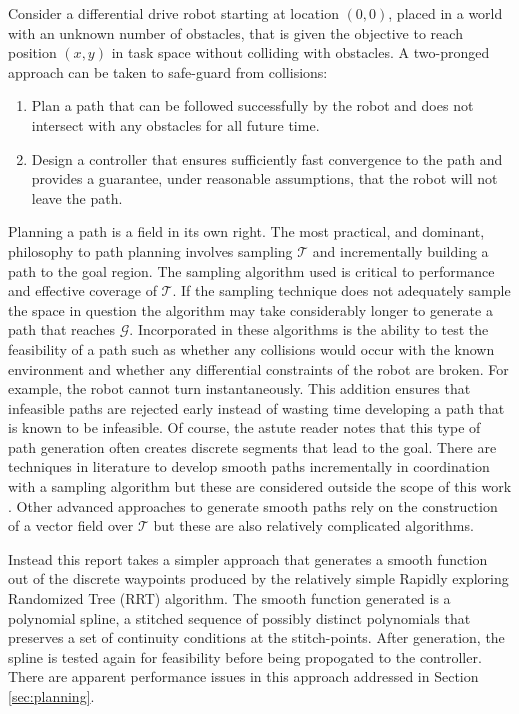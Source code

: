 \documentclass[oneside, 11pt]{book}
\begin{document}
Consider a differential drive robot starting at location $(0,0)$, placed in a world with an unknown number of obstacles, that is given the objective to reach position $(x,y)$ in task space without colliding with obstacles. A two-pronged approach can be taken to safe-guard from collisions:
\begin{enumerate}
    \item Plan a path that can be followed successfully by the robot and does not intersect with any obstacles for all future time.
    \item Design a controller that ensures sufficiently fast convergence to the path and provides a guarantee, under reasonable assumptions, that the robot will not leave the path.
\end{enumerate}

Planning a path is a field in its own right. The most practical, and dominant, philosophy to path planning involves sampling $\mathcal{T}$ and incrementally building a path to the goal region. The sampling algorithm used is critical to performance and effective coverage of $\mathcal{T}$. If the sampling technique does not adequately sample the space in question the algorithm may take considerably longer to generate a path that reaches $\mathcal{G}$. Incorporated in these algorithms is the ability to test the feasibility of a path such as whether any collisions would occur with the known environment and whether any differential constraints of the robot are broken. For example, the robot cannot turn instantaneously. This addition ensures that infeasible paths are rejected early instead of wasting time developing a path that is known to be infeasible. Of course, the astute reader notes that this type of path generation often creates discrete segments that lead to the goal. There are techniques in literature to develop smooth paths incrementally in coordination with a sampling algorithm but these are considered outside the scope of this work \cite{Yang14}. Other advanced approaches to generate smooth paths rely on the construction of a vector field over $\mathcal{T}$ \cite{LaValle06} but these are also relatively complicated algorithms.

Instead this report takes a simpler approach that generates a smooth function out of the discrete waypoints produced by the relatively simple Rapidly exploring Randomized Tree (RRT) algorithm. The smooth function generated is a polynomial spline, a stitched sequence of possibly distinct polynomials that preserves a set of continuity conditions at the stitch-points. After generation, the spline is tested again for feasibility before being propogated to the controller. There are apparent performance issues in this approach addressed in Section \ref{sec:planning}.
\end{document}
